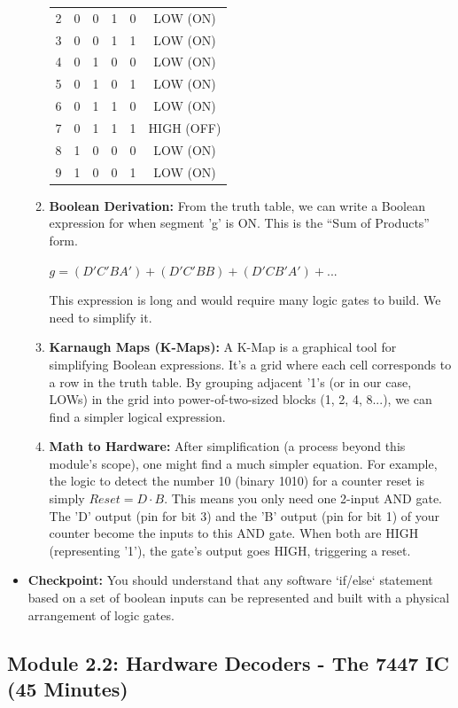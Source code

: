 \documentclass[11pt,a4paper]{article}
\begin{document}
\begin{itemize}
\begin{enumerate}[label=\arabic*.]
\begin{center}
\begin{tabular}{ccccc|c}
        2 & 0 & 0 & 1 & 0 & LOW (ON) \\
        3 & 0 & 0 & 1 & 1 & LOW (ON) \\
        4 & 0 & 1 & 0 & 0 & LOW (ON) \\
        5 & 0 & 1 & 0 & 1 & LOW (ON) \\
        6 & 0 & 1 & 1 & 0 & LOW (ON) \\
        7 & 0 & 1 & 1 & 1 & HIGH (OFF) \\
        8 & 1 & 0 & 0 & 0 & LOW (ON) \\
        9 & 1 & 0 & 0 & 1 & LOW (ON) \\
        \bottomrule
        \end{tabular}
        \end{center}
        \item \textbf{Boolean Derivation:} From the truth table, we can write a Boolean expression for when segment 'g' is ON. This is the ``Sum of Products'' form.
        \begin{center}
        $g = (D'C'BA') + (D'C'BB) + (D'CB'A') + ...$
        \end{center}
        This expression is long and would require many logic gates to build. We need to simplify it.
        \item \textbf{Karnaugh Maps (K-Maps):} A K-Map is a graphical tool for simplifying Boolean expressions. It's a grid where each cell corresponds to a row in the truth table. By grouping adjacent '1's (or in our case, LOWs) in the grid into power-of-two-sized blocks (1, 2, 4, 8...), we can find a simpler logical expression.
        \item \textbf{Math to Hardware:} After simplification (a process beyond this module's scope), one might find a much simpler equation. For example, the logic to detect the number 10 (binary 1010) for a counter reset is simply $Reset = D \cdot B$. This means you only need one 2-input AND gate. The 'D' output (pin for bit 3) and the 'B' output (pin for bit 1) of your counter become the inputs to this AND gate. When both are HIGH (representing '1'), the gate's output goes HIGH, triggering a reset.
    \end{enumerate}
    \item \textbf{Checkpoint:} You should understand that any software `if/else` statement based on a set of boolean inputs can be represented and built with a physical arrangement of logic gates.
\end{itemize}
\newpage
\subsection*{Module 2.2: Hardware Decoders - The 7447 IC (45 Minutes)}
\end{document}
